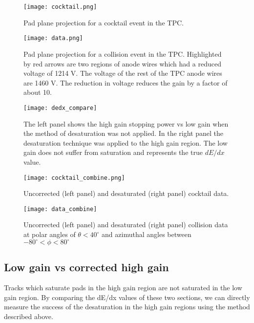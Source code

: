 \begin{figure}[ht!]
\texttt{[image: cocktail.png]}
\caption{Pad plane projection for a cocktail event in the TPC.}
\label{fig:cocktail}
\end{figure}

\begin{figure}[ht!]
\texttt{[image: data.png]}
\caption{Pad plane projection for a collision event in the TPC. Highlighted by red arrows are two regions of anode wires which had a reduced voltage of 1214 V. The voltage of the rest of the TPC anode wires are 1460 V. The reduction in voltage reduces the gain by a factor of about 10. }
\label{fig:data}
\end{figure}


\begin{figure*}[t]
\centering
\texttt{[image: dedx\_compare]}
\caption{The left panel shows the high gain stopping power vs low gain when the method of desaturation was not applied. In the right panel the desaturation technique was applied to the high gain region. The low gain does not suffer from saturation and represents the true $dE/dx$ value.}
\label{fig:lowvshigh}
\end{figure*}

\begin{figure*}[t]
\texttt{[image: cocktail\_combine.png]}
\caption{Uncorrected (left panel) and desaturated (right panel) cocktail data.}
\label{fig:cocktail_combine}
\end{figure*}

\begin{figure*}[t]
\texttt{[image: data\_combine]}
\caption{Uncorrected (left panel) and desaturated (right panel) collision data at polar angles of $\theta < 40^{\circ}$ and azimuthal angles between $-80^{\circ} < \phi < 80^{\circ}$}
\label{fig:data_combine}
\end{figure*}

\subsection{Low gain vs corrected high gain}

Tracks which saturate pads in the high gain region are not saturated in the low gain region. By comparing the dE/dx values of these two sections, we can directly measure the success of the desaturation in the high gain regions using the method described above.  
 
